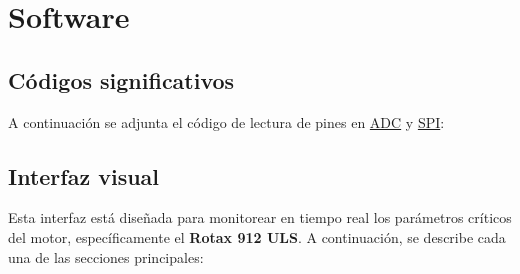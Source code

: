 \chapter{Software}

\section{Códigos significativos}
A continuación se adjunta el código de lectura de pines en \hyperref[adc_code]{ADC} y \hyperref[spi_code]{SPI}:



\newpage

\section{Interfaz visual}

Esta interfaz está diseñada para monitorear en tiempo real los parámetros críticos del motor, específicamente el \textbf{Rotax 912 ULS}. A continuación, se describe cada una de las secciones principales:

